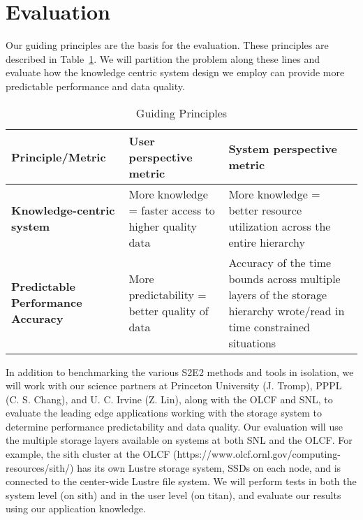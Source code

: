 \section{Evaluation}
\label{sec:evaluation}

Our guiding principles are the basis for the evaluation. These principles are
described in Table~\ref{table:eval}.  We will partition the problem along these
lines and evaluate how the knowledge centric system design we employ can
provide more predictable performance and data quality. 

\begin{table}[ht]

\centering
\begin{tabular}{ | p{1.4in} | p{2in} | p{2.5in} | }
  \hline
  {\bf Principle/Metric}                   & {\bf User perspective metric}   & {\bf System perspective metric }\\ \hline
  {\bf Knowledge-centric system}           & More knowledge = faster access to higher quality data &  More knowledge = better resource utilization across the entire hierarchy \\ \hline
  {\bf Predictable Performance Accuracy}   & More predictability = better quality of data &  Accuracy of the time bounds across multiple layers of the storage hierarchy wrote/read in time constrained situations\\ \hline
\end{tabular}

\caption{Guiding Principles}
\label{table:eval}
\end{table}

In addition to benchmarking the various S2E2 methods and tools in isolation,
we will work with our science partners at Princeton University (J. Tromp),
PPPL (C. S. Chang), and U. C. Irvine (Z. Lin), along with the OLCF and SNL,
to evaluate the leading edge applications working with the storage system to
determine performance predictability and data quality.  Our evaluation 
will use the multiple storage layers available on systems at both SNL and the
OLCF.  For example, the sith cluster at the OLCF
(https://www.olcf.ornl.gov/computing-resources/sith/) has its own Lustre
storage system, SSDs on each node, and is connected to the center-wide Lustre
file system. We will perform tests in both the system level (on sith) and in
the user level (on titan), and evaluate our results using our application
knowledge.


